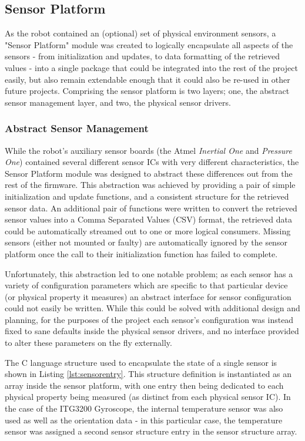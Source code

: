 \FloatBarrier
\subsection{Sensor Platform}

As the robot contained an (optional) set of physical environment sensors, a "Sensor Platform" module was created to logically encapsulate all aspects of the sensors - from initialization and updates, to data formatting of the retrieved values - into a single package that could be integrated into the rest of the project easily, but also remain extendable enough that it could also be re-used in other future projects. Comprising the sensor platform is two layers; one, the abstract sensor management layer, and two, the physical sensor drivers.

\FloatBarrier
\subsubsection{Abstract Sensor Management}

While the robot's auxiliary sensor boards (the Atmel \textit{Inertial One} and \textit{Pressure One}) contained several different sensor ICs with very different characteristics, the Sensor Platform module was designed to abstract these differences out from the rest of the firmware. This abstraction was achieved by providing a pair of simple initialization and update functions, and a consistent structure for the retrieved sensor data. An additional pair of functions were written to convert the retrieved sensor values into a Comma Separated Values (CSV) format, the retrieved data could be automatically streamed out to one or more logical consumers. Missing sensors (either not mounted or faulty) are automatically ignored by the sensor platform once the call to their initialization function has failed to complete.

Unfortunately, this abstraction led to one notable problem; as each sensor has a variety of configuration parameters which are specific to that particular device (or physical property it measures) an abstract interface for sensor configuration could not easily be written. While this could be solved with additional design and planning, for the purposes of the project each sensor's configuration was instead fixed to sane defaults inside the physical sensor drivers, and no interface provided to alter these parameters on the fly externally.

The C language structure used to encapsulate the state of a single sensor is shown in Listing \ref{lst:sensorentry}. This structure definition is instantiated as an array inside the sensor platform, with one entry then being dedicated to each physical property being measured (as distinct from each physical sensor IC). In the case of the ITG3200 Gyroscope, the internal temperature sensor was also used as well as the orientation data - in this particular case, the temperature sensor was assigned a second sensor structure entry in the sensor structure array.

